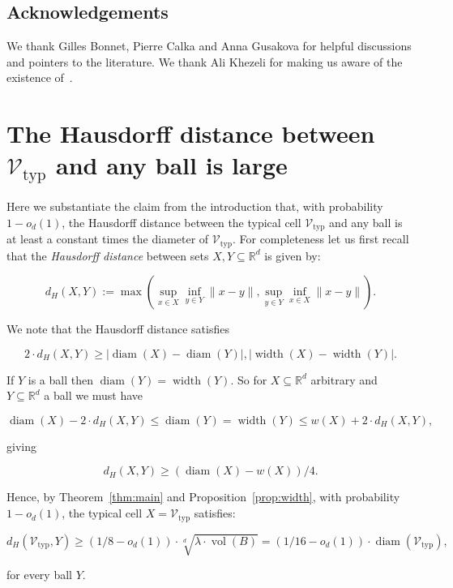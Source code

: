 \documentclass[11pt]{article}%
\newcommand{\Vcal}[0]{\ensuremath{{\mathcal V}}}
\newcommand{\eR}[0]{\ensuremath{ \mathbb R}}
\newcommand{\norm}[1]{\ensuremath{\|#1\|}}
\DeclareMathOperator{\vol}{vol}
\DeclareMathOperator{\diam}{diam}
\DeclareMathOperator{\width}{width}
\newcommand{\Vtyp}[0]{\Vcal_{\text{typ}}}
\begin{document}
\subsection*{Acknowledgements}


We thank Gilles Bonnet, Pierre Calka and Anna Gusakova for helpful discussions and pointers to the literature.
We thank Ali Khezeli for making us aware of the existence of~\cite{AlishahiThesis}.





\appendix

\section{The Hausdorff distance between $\Vtyp$ and any ball is large\label{sec:Hausdorff}}


Here we substantiate the claim from the introduction that, with probability $1-o_d(1)$, the Hausdorff distance 
between the typical cell $\Vtyp$ and any ball is at least 
a constant times the diameter of $\Vtyp$.
For completeness let us first recall that the {\em Hausdorff distance} between sets $X, Y \subseteq \eR^d$ is 
given by:

$$ d_H(X,Y) := \max\left( \sup_{x\in X} \inf_{y\in Y} \norm{x-y}, \sup_{y \in Y} \inf_{x\in X} \norm{x-y} \right). $$

\noindent
We note that the Hausdorff distance satisfies

$$ 2\cdot d_H(X,Y) \geq |\diam(X)-\diam(Y)|, |\width(X)-\width(Y)|. $$

\noindent
If $Y$ is a ball then $\diam(Y)=\width(Y)$.
So for $X \subseteq \eR^d$ arbitrary 
and $Y \subseteq \eR^d$ a ball we must have 

$$ \diam(X)-2\cdot d_H(X,Y)\leq \diam(Y)=\width(Y) \leq w(X) + 2\cdot d_H(X,Y), $$

\noindent
giving  

$$d_H(X,Y) \geq (\diam(X)-w(X))/4.$$

Hence, by Theorem~\ref{thm:main} and Proposition~\ref{prop:width}, with probability $1-o_d(1)$, the typical 
cell $X=\Vtyp$ satisfies:

$$ d_H(\Vtyp, Y) \geq (1/8-o_d(1))\cdot \sqrt[d]{\lambda \cdot \vol(B)} 
= (1/16-o_d(1))\cdot\diam(\Vtyp), $$

\noindent 
for every ball $Y$.
\end{document}
